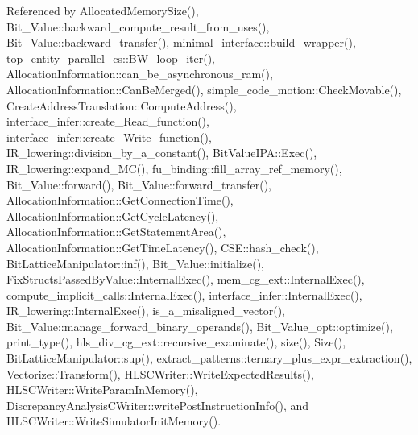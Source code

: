 Referenced by Allocated\+Memory\+Size(), Bit\+\_\+\+Value\+::backward\+\_\+compute\+\_\+result\+\_\+from\+\_\+uses(), Bit\+\_\+\+Value\+::backward\+\_\+transfer(), minimal\+\_\+interface\+::build\+\_\+wrapper(), top\+\_\+entity\+\_\+parallel\+\_\+cs\+::\+B\+W\+\_\+loop\+\_\+iter(), Allocation\+Information\+::can\+\_\+be\+\_\+asynchronous\+\_\+ram(), Allocation\+Information\+::\+Can\+Be\+Merged(), simple\+\_\+code\+\_\+motion\+::\+Check\+Movable(), Create\+Address\+Translation\+::\+Compute\+Address(), interface\+\_\+infer\+::create\+\_\+\+Read\+\_\+function(), interface\+\_\+infer\+::create\+\_\+\+Write\+\_\+function(), I\+R\+\_\+lowering\+::division\+\_\+by\+\_\+a\+\_\+constant(), Bit\+Value\+I\+P\+A\+::\+Exec(), I\+R\+\_\+lowering\+::expand\+\_\+\+M\+C(), fu\+\_\+binding\+::fill\+\_\+array\+\_\+ref\+\_\+memory(), Bit\+\_\+\+Value\+::forward(), Bit\+\_\+\+Value\+::forward\+\_\+transfer(), Allocation\+Information\+::\+Get\+Connection\+Time(), Allocation\+Information\+::\+Get\+Cycle\+Latency(), Allocation\+Information\+::\+Get\+Statement\+Area(), Allocation\+Information\+::\+Get\+Time\+Latency(), C\+S\+E\+::hash\+\_\+check(), Bit\+Lattice\+Manipulator\+::inf(), Bit\+\_\+\+Value\+::initialize(), Fix\+Structs\+Passed\+By\+Value\+::\+Internal\+Exec(), mem\+\_\+cg\+\_\+ext\+::\+Internal\+Exec(), compute\+\_\+implicit\+\_\+calls\+::\+Internal\+Exec(), interface\+\_\+infer\+::\+Internal\+Exec(), I\+R\+\_\+lowering\+::\+Internal\+Exec(), is\+\_\+a\+\_\+misaligned\+\_\+vector(), Bit\+\_\+\+Value\+::manage\+\_\+forward\+\_\+binary\+\_\+operands(), Bit\+\_\+\+Value\+\_\+opt\+::optimize(), print\+\_\+type(), hls\+\_\+div\+\_\+cg\+\_\+ext\+::recursive\+\_\+examinate(), size(), Size(), Bit\+Lattice\+Manipulator\+::sup(), extract\+\_\+patterns\+::ternary\+\_\+plus\+\_\+expr\+\_\+extraction(), Vectorize\+::\+Transform(), H\+L\+S\+C\+Writer\+::\+Write\+Expected\+Results(), H\+L\+S\+C\+Writer\+::\+Write\+Param\+In\+Memory(), Discrepancy\+Analysis\+C\+Writer\+::write\+Post\+Instruction\+Info(), and H\+L\+S\+C\+Writer\+::\+Write\+Simulator\+Init\+Memory().

